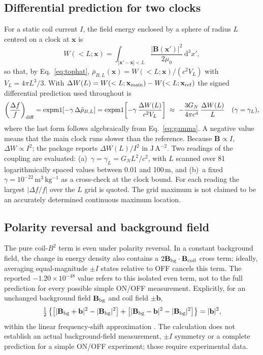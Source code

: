 \documentclass[12pt,a4paper]{article}
\newcommand{\dd}{\mathrm{d}}
\begin{document}
\subsection{Differential prediction for two clocks}
For a static coil current $I$, the field energy enclosed by a sphere of radius $L$ centred on a clock at
$\mathbf x$ is
\begin{equation}
W(<L;\mathbf x)=\int_{|\mathbf x'-\mathbf x|<L}\frac{|\mathbf B(\mathbf x')|^2}{2\mu_0}\,\dd^3x' ,
\end{equation}
so that, by Eq.~\eqref{eq:tophat}, $\bar\rho_{B,L}(\mathbf x)=W(<L;\mathbf x)/(c^2V_L)$ with
$V_L=4\pi L^3/3$. With $\Delta W(L)=W(<L;\mathbf x_{\rm main})-W(<L;\mathbf x_{\rm ref})$ the signed
differential prediction used throughout is
\begin{equation}
\left(\frac{\Delta f}{f}\right)_{\rm diff}=\operatorname{expm1}\!\left[-\gamma\,\Delta\bar\rho_{B,L}\right]
=\operatorname{expm1}\!\left[-\gamma\,\frac{\Delta W(L)}{c^2V_L}\right]
\;\approx\;-\frac{3G_N}{4\pi c^4}\,\frac{\Delta W(L)}{L}\quad(\gamma=\gamma_L),
\label{eq:diff}
\end{equation}
where the last form follows algebraically from Eq.~\eqref{eq:gamma}. A negative value means that the
main clock runs slower than the reference. Because $\mathbf B\propto I$, $\Delta W\propto I^2$; the
package reports $\Delta W(L)/I^2$ in $\mathrm{J\,A^{-2}}$. Two readings of the coupling are evaluated:
(a)~$\gamma=\gamma_L=G_NL^2/c^2$, with $L$ scanned over 81 logarithmically spaced values between 0.01
and 100\,m, and (b)~a fixed $\gamma=10^{-22}\,\mathrm{m^3\,kg^{-1}}$ as a cross-check at the clock bound.
For each reading the largest $|\Delta f/f|$ over the $L$ grid is quoted. The grid maximum is not
claimed to be an accurately determined continuous maximum location.

\subsection{Polarity reversal and background field}\label{sec:polarity}
The pure coil-$B^2$ term is even under polarity reversal. In a constant background field, the change
in energy density also contains a $2\mathbf B_{\rm bg}\cdot\mathbf B_{\rm coil}$ cross term; ideally,
averaging equal-magnitude $\pm I$ states relative to OFF cancels this term. The reported
$-1.20\times10^{-48}$ value refers to this isolated even term, not to the full prediction for every
possible simple ON/OFF measurement. Explicitly, for an unchanged background field $\mathbf B_{\rm bg}$
and coil field $\pm\mathbf b$,
\begin{equation}
\tfrac12\left\{\left[|\mathbf B_{\rm bg}+\mathbf b|^2-|\mathbf B_{\rm bg}|^2\right]+
\left[|\mathbf B_{\rm bg}-\mathbf b|^2-|\mathbf B_{\rm bg}|^2\right]\right\}=|\mathbf b|^2 ,
\label{eq:pm}
\end{equation}
within the linear frequency-shift approximation \cite{TAL_V20}. The calculation does not establish an
actual background-field measurement, $\pm I$ symmetry or a complete prediction for a simple ON/OFF
experiment; those require experimental data.
\end{document}
